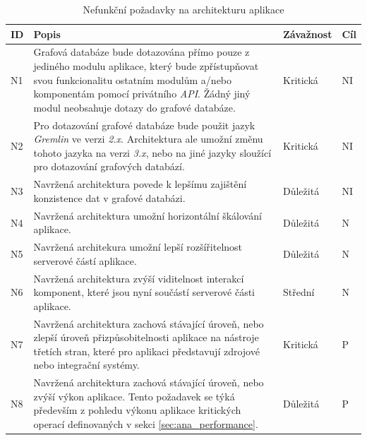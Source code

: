 \begin{table}[h!]
\begin{center}
\centering
\caption{Nefunkční požadavky na architekturu aplikace}
\label{tab:nonfuncional}
\begin{tabular}{|p{1cm}|p{9cm}|p{2cm}|p{1cm}|}
	\hline
    ID & Popis & Závažnost & Cíl \\ \hline

    N1 & Grafová databáze bude dotazována přímo pouze z jediného modulu aplikace, který bude zpřístupňovat svou funkcionalitu ostatním modulům a/nebo komponentám pomocí privátního \textit{API}.  Žádný jiný modul neobsahuje dotazy do grafové databáze. & Kritická  & NI  \\ \hline

	 N2 & Pro dotazování grafové databáze bude použit jazyk \textit{Gremlin} ve verzi \textit{2.x}. Architektura ale umožní změnu tohoto jazyka na verzi \textit{3.x}, nebo na jiné jazyky sloužící pro dotazování grafových databází. & Kritická  & NI  \\ \hline

	 N3 & Navržená architektura povede k lepšímu zajištění konzistence dat v grafové databázi. & Důležitá & NI \\ \hline

	 N4 & Navržená architektura umožní horizontální škálování aplikace. & Důležitá  & N   \\ \hline

	 N5 & Navržená architekura umožní lepší rozšířitelnost serverové částí aplikace. & Důležitá & N \\ \hline

	 N6 & Navržená architektura zvýší viditelnost interakcí komponent, které jsou nyní součástí serverové části aplikace.  & Střední & N \\ \hline

	 N7 & Navržená architektura zachová stávající úroveň, nebo zlepší úroveň přizpůsobitelnosti aplikace na nástroje třetích stran, které pro aplikaci představují zdrojové nebo integrační systémy. & Kritická & P \\ \hline

	 N8 & Navržená architektura zachová stávající úroveň, nebo zvýší výkon aplikace. Tento požadavek se týká především z pohledu výkonu aplikace kritických operací definovaných v sekci \ref{sec:ana_performance}. & Důležitá & P \\ \hline
 \end{tabular}
 \end{center}
 \end{table}

